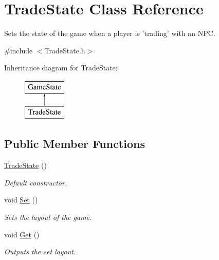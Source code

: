 \hypertarget{classTradeState}{\section{Trade\-State Class Reference}
\label{classTradeState}
}


Sets the state of the game when a player is 'trading' with an N\-P\-C.  




{\ttfamily \#include $<$Trade\-State.\-h$>$}

Inheritance diagram for Trade\-State\-:\begin{figure}[H]
\begin{center}
\leavevmode
\includegraphics[height=2.000000cm]{classTradeState}
\end{center}
\end{figure}
\subsection*{Public Member Functions}
\begin{DoxyCompactItemize}
\item 
\hypertarget{classTradeState_a1778870265717d50054d29be886b27d4}{\hyperlink{classTradeState_a1778870265717d50054d29be886b27d4}{Trade\-State} ()}\label{classTradeState_a1778870265717d50054d29be886b27d4}

\begin{DoxyCompactList}\small\item\em Default constructor. \end{DoxyCompactList}\item 
\hypertarget{classTradeState_af0d9fdcd649c1e74620dc77a4b8f92f9}{void \hyperlink{classTradeState_af0d9fdcd649c1e74620dc77a4b8f92f9}{Set} ()}\label{classTradeState_af0d9fdcd649c1e74620dc77a4b8f92f9}

\begin{DoxyCompactList}\small\item\em Sets the layout of the game. \end{DoxyCompactList}\item 
\hypertarget{classTradeState_a6479e704b1063281721200a0beac6bc1}{void \hyperlink{classTradeState_a6479e704b1063281721200a0beac6bc1}{Get} ()}\label{classTradeState_a6479e704b1063281721200a0beac6bc1}

\begin{DoxyCompactList}\small\item\em Outputs the set layout. \end{DoxyCompactList}\end{DoxyCompactItemize}
